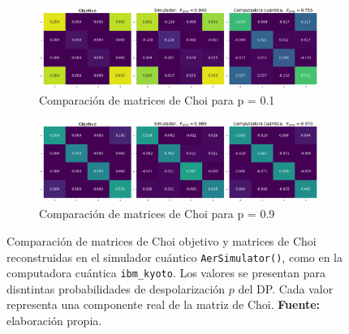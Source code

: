 \documentclass[letterpaper,12pt]{thesisECFM}
\theoremstyle{plain}
\theoremstyle{definition}
\theoremstyle{definition}
\theoremstyle{remark}
\newcommand{\1}{\mathbb{1}}
\begin{document}
\begin{figure}[h!] %
    \centering
    \begin{subfigure}{\textwidth}
        \centering
        \includegraphics[width=1\linewidth]{imagenes/comp_choi_p0.1.png}
        \caption{Comparación de matrices de Choi para p = 0.1}
        \label{fig:choi_p0.1}
    \end{subfigure}
    \vspace{1em} %
    
    \begin{subfigure}{\textwidth}
        \centering
        \includegraphics[width=1\linewidth]{imagenes/comp_choi_p0.9.png}
        \caption{Comparación de matrices de Choi para p = 0.9}
        \label{fig:choi_p0.9}
    \end{subfigure}
    
    \caption[Comparación de matrices de Choi objetivo y
reconstruidas]{
    Comparación de matrices de Choi objetivo y matrices de Choi reconstruidas en el simulador cuántico \texttt{AerSimulator()}, como en la computadora cuántica \texttt{ibm\_kyoto}. Los valores se presentan para disntintas probabilidades de despolarización $p$ del DP. Cada valor representa una componente real de la matriz de Choi. \textbf{Fuente:} elaboración propia.}
    \label{fig:comparacion_choi}
\end{figure} %

\backmatter
\end{document}

